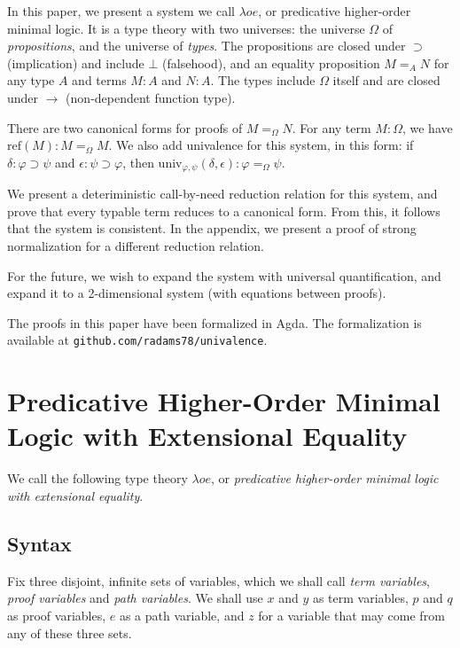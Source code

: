 \documentclass[a4paper,UKenglish]{lipics-v2016}
\newcommand*{\reff}[1]{\ensuremath{\mathrm{ref} \left( {#1} \right)}}
\newcommand*{\univ}[4]{\ensuremath{\mathrm{univ}_{{#1}, {#2}} \left({#3} , {#4} \right)}}
\theoremstyle{plain}
\theoremstyle{definition}
\begin{document}
In this paper, we present a system we call $\lambda o e$, or predicative higher-order minimal logic.  It is a type theory with two universes: the universe $\Omega$
of \emph{propositions}, and the universe of \emph{types}.  The propositions are closed under $\supset$ (implication) and include $\bot$ (falsehood), and an equality proposition $M =_A N$ for
any type $A$ and terms $M : A$ and $N : A$.  The types include $\Omega$ itself and are closed under $\rightarrow$ (non-dependent function type).

There are two canonical forms for proofs of $M =_\Omega N$.  For any term $M : \Omega$, we have $\reff{M} : M =_\Omega M$.  We also add univalence for this system, in this form:
if $\delta : \varphi \supset \psi$ and $\epsilon : \psi \supset\varphi$, then $\univ{\varphi}{\psi}{\delta}{\epsilon} : \varphi =_\Omega \psi$.  

We present a deteriministic call-by-need reduction relation for this system, and prove that every typable term reduces to a canonical form.  From this, it follows that the system is consistent.  In the appendix, we present a proof of strong normalization for a different reduction relation.

For the future, we wish to expand the system with universal quantification, and expand it to a 2-dimensional system (with equations between proofs).

The proofs in this paper have been formalized in Agda.  The formalization is available at \texttt{github.com/radams78/univalence}.

\section{Predicative Higher-Order Minimal Logic with Extensional Equality}

We call the following type theory $\lambda o e$, or \emph{predicative higher-order minimal logic with extensional equality}.  

\subsection{Syntax}

Fix three disjoint, infinite sets of variables, which we shall call \emph{term variables}, \emph{proof variables}
and \emph{path variables}.  We shall use $x$ and $y$ as term variables, $p$ and $q$ as proof variables,
$e$ as a path variable, and $z$ for a variable that may come from any of these three sets.
\end{document}
